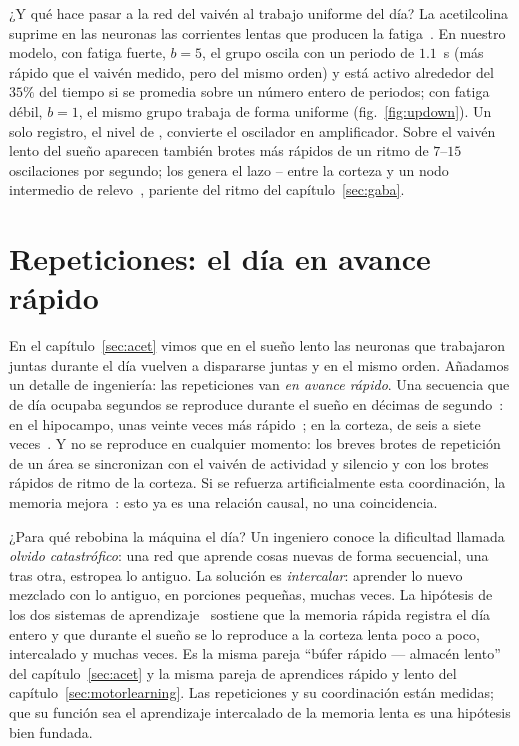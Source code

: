 ¿Y qué hace pasar a la red del vaivén al trabajo uniforme del día? La acetilcolina suprime en las neuronas las corrientes lentas que producen la fatiga~\cite{McCormick1992}. En nuestro modelo, con fatiga fuerte, $b=5$, el grupo oscila con un periodo de $1.1$~s (más rápido que el vaivén medido, pero del mismo orden) y está activo alrededor del $35\%$ del tiempo si se promedia sobre un número entero de periodos; con fatiga débil, $b=1$, el mismo grupo trabaja de forma uniforme (fig.~\ref{fig:updown}). Un solo registro, el nivel de , convierte el oscilador en amplificador. Sobre el vaivén lento del sueño aparecen también brotes más rápidos de un ritmo de $7$--$15$ oscilaciones por segundo; los genera el lazo -- entre la corteza y un nodo intermedio de relevo~\cite{SteriadeMcCormickSejnowski1993}, pariente del ritmo del capítulo~\ref{sec:gaba}.

\section{Repeticiones: el día en avance rápido}

En el capítulo~\ref{sec:acet} vimos que en el sueño lento las neuronas que trabajaron juntas durante el día vuelven a dispararse juntas y en el mismo orden. Añadamos un detalle de ingeniería: las repeticiones van \emph{en avance rápido}. Una secuencia que de día ocupaba segundos se reproduce durante el sueño en décimas de segundo~\cite{Nadasdy1999}: en el hipocampo, unas veinte veces más rápido~\cite{LeeWilson2002}; en la corteza, de seis a siete veces~\cite{Euston2007}. Y no se reproduce en cualquier momento: los breves brotes de repetición de un área se sincronizan con el vaivén de actividad y silencio y con los brotes rápidos de ritmo de la corteza. Si se refuerza artificialmente esta coordinación, la memoria mejora~\cite{Maingret2016}: esto ya es una relación causal, no una coincidencia.

¿Para qué rebobina la máquina el día? Un ingeniero conoce la dificultad llamada \emph{olvido catastrófico}: una red que aprende cosas nuevas de forma secuencial, una tras otra, estropea lo antiguo. La solución es \emph{intercalar}: aprender lo nuevo mezclado con lo antiguo, en porciones pequeñas, muchas veces. La hipótesis de los dos sistemas de aprendizaje~\cite{McClelland1995} sostiene que la memoria rápida registra el día entero y que durante el sueño se lo reproduce a la corteza lenta poco a poco, intercalado y muchas veces. Es la misma pareja “búfer rápido --- almacén lento” del capítulo~\ref{sec:acet} y la misma pareja de aprendices rápido y lento del capítulo~\ref{sec:motorlearning}. Las repeticiones y su coordinación están medidas; que su función sea el aprendizaje intercalado de la memoria lenta es una hipótesis bien fundada.

